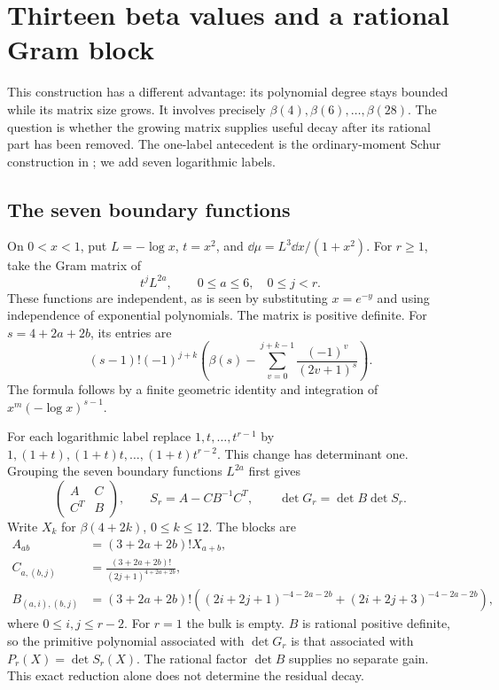 \section{Thirteen beta values and a rational Gram block}\label{sec:gram}
This construction has a different advantage: its polynomial degree stays
bounded while its matrix size grows. It involves precisely
$\beta(4),\beta(6),\ldots,\beta(28)$. The question is whether the growing
matrix supplies useful decay after its rational part has been removed.
The one-label antecedent is the ordinary-moment Schur construction in
\cite[Section~8]{firstsupp}; we add seven logarithmic labels.

\subsection{The seven boundary functions}
On $0<x<1$, put $L=-\log x$, $t=x^2$, and
$\dd\mu=L^3\dd x/(1+x^2)$. For $r\geq1$, take the Gram matrix of
\[
 t^jL^{2a},\qquad 0\leq a\leq6,\quad0\leq j<r.
\]
These functions are independent, as is seen by substituting $x=e^{-y}$
and using independence of exponential polynomials. The matrix is positive
definite. For $s=4+2a+2b$, its entries are
\[
 (s-1)!(-1)^{j+k}\left(\beta(s)-
          \sum_{v=0}^{j+k-1}\frac{(-1)^v}{(2v+1)^s}\right).
\]
The formula follows by a finite geometric identity and integration
of $x^m(-\log x)^{s-1}$.

For each logarithmic label replace
$1,t,\ldots,t^{r-1}$ by $1,(1+t),(1+t)t,\ldots,(1+t)t^{r-2}$.
This change has determinant one. Grouping the seven boundary functions
$L^{2a}$ first gives
\begin{equation}\label{eq:seven-schur}
 \begin{pmatrix}A&C\\C^T&B\end{pmatrix},\qquad
 S_r=A-CB^{-1}C^T,\qquad \det G_r=\det B\det S_r.
\end{equation}
Write $X_k$ for $\beta(4+2k)$, $0\leq k\leq12$. The blocks are
\begin{align*}
 A_{ab}&=(3+2a+2b)!X_{a+b},\\
 C_{a,(b,j)}&=\frac{(3+2a+2b)!}{(2j+1)^{4+2a+2b}},\\
 B_{(a,i),(b,j)}&=(3+2a+2b)!\left(
 (2i+2j+1)^{-4-2a-2b}+(2i+2j+3)^{-4-2a-2b}\right),
\end{align*}
where $0\leq i,j\leq r-2$. For $r=1$ the bulk is empty.
$B$ is rational positive definite, so the primitive polynomial associated
with $\det G_r$ is that associated with
$P_r(X)=\det S_r(X)$. The rational factor $\det B$ supplies no separate
gain. This exact reduction alone does not determine the residual decay.

